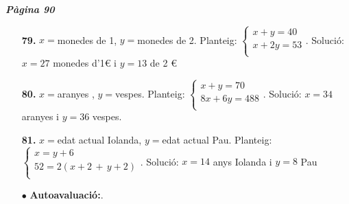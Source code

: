 \documentclass[a4paper, pdf, twoside]{book}
\begin{document}
\begin{multicols}{2}
{\textbf{\em Pàgina 90}} \hrulefill
\begin{enumerate}
\vspace{0.25cm}
\item[\fontfamily{phv}\selectfont\color{blue}\textbf{79. }] 
$x=$monedes de 1, $y=$monedes de 2. Planteig: $\left \{\begin {array}{l} x+y=40\\ x+2y=53\\ \end {array} \right .$. Solució: $x=27$ monedes d'1\euro {} i $y=13$ de 2 \euro {}
 \end{enumerate}
\begin{enumerate}
\vspace{0.25cm}
\item[\fontfamily{phv}\selectfont\color{blue}\textbf{80. }] 
$x=$aranyes , $y=$vespes. Planteig: $\left \{\begin {array}{l} x+y=70 \\ 8x+6y=488\\ \end {array} \right .$. Solució: $x=34$ aranyes i $y=36$ vespes.
\vspace{0.25cm}
\item[\fontfamily{phv}\selectfont\color{blue}\textbf{81. }] 
$x=$edat actual Iolanda, $y=$edat actual Pau. Planteig: $\left \{\begin {array}{l} x = y +6\\ 52 = 2 ( x+2 \, +\, y+2 )\\ \end {array} \right .$. Solució: $x=14$ anys Iolanda i $y=8$ Pau 
\vspace{0.25cm}
 \item[$\bullet$ ] {\selectfont\color{blue}\textbf{Autoavaluació:}. }


\end{enumerate}
\end{multicols}
\end{document}
